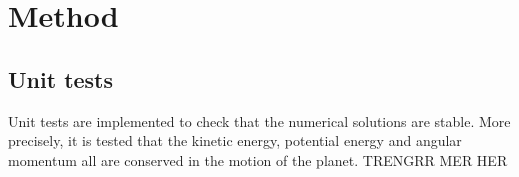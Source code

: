 \section{Method}

\subsection{Unit tests}
Unit tests are implemented to check that the numerical solutions are stable. More precisely, it is tested that the kinetic energy, potential energy and angular momentum all are conserved in the motion of the planet. TRENGRR MER HER